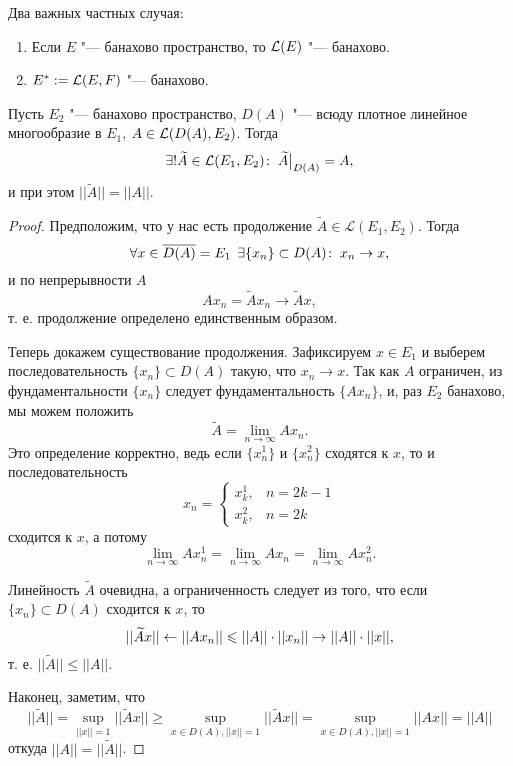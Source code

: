 \documentclass[main]{subfiles}
\begin{document}
\begin{corollary}
  Два важных частных случая:
  \begin{enumerate}
    \item Если \( E \) "--- банахово пространство, то \( \Linears{E} \) "---
      банахово.
    \item  \( E^* := \Linears{E}[F] \) "--- банахово.
  \end{enumerate}
\end{corollary}

\begin{theorem}
  Пусть \( E_2 \) "--- банахово пространство,
  \( D(A) \) "--- всюду плотное линейное многообразие
  в \( E_1 \), \( A \in \Linears{D(A)}[E_2] \).
  Тогда 
  \[
    \ExistsOne{\widetilde{A} \in \Linears{E_1}[E_2]}
    {\widetilde{A} \bigr|}_{D(A)} = A,
  \]
  и при этом \( ||\widetilde{A}|| = ||A|| \).
\end{theorem}
\begin{proof}
  Предположим, что у нас есть продолжение
  \( \widetilde{A} \in \mathcal{L}(E_1, E_2) \).
  Тогда
  \[
    \forall {x \in \overline{D(A)} = E_1} \; \,
    \exists  \{ x_n \} \subset D(A)  \colon \:
    x_n \to x,
  \]
  и по непрерывности \( A \)
  \[
    A x_n = \widetilde{A} x_n \to \widetilde{A} x,
  \]
  т. е. продолжение определено единственным образом.

  Теперь докажем существование продолжения.
  Зафиксируем \( x \in E_1 \) и выберем
  последовательность \( \{ x_n \} \subset D(A) \)
  такую, что \( x_n \to x \).
  Так как \( A \) ограничен, из фундаментальности
  \( \{ x_n \} \) следует фундаментальность
  \( \{ A x_n \} \), и, раз \( E_2 \) банахово,
  мы можем положить
  \[
    \widetilde{A} = \lim_{n \to \infty} A x_n.
  \]
  Это определение корректно, ведь если
  \( \{ x^1_n \} \) и \( \{ x^2_n \} \)
  сходятся к \( x \), то
  и последовательность
  \[
    x_n = \begin{cases}
      x^1_k, & n = 2k - 1 \\
      x^2_k, & n = 2k
    \end{cases}
  \]
  сходится к \( x \), а потому
  \[
    \lim_{n \to \infty} A x^1_n =
    \lim_{n \to \infty} A x_n = 
    \lim_{n \to \infty} A x^2_n.
  \]

  Линейность \( \widetilde{A} \) очевидна,
  а ограниченность следует из того,
  что если \( \{ x_n \} \subset D(A) \)
  сходится к \( x \),
  то
  \[
    ||\widetilde{A} x|| \leftarrow
    ||A x_n|| \leqslant
    ||A|| \cdot ||x_n|| \to
    ||A|| \cdot ||x||,
  \]
  т. е. \( ||\widetilde{A}|| \le ||A|| \).

  Наконец, заметим, что
  \[
    ||\widetilde{A}|| =
    \sup_{||x|| = 1} ||\widetilde{A} x|| \ge
    \sup_{x \in D(A), ||x|| = 1} ||\widetilde{A} x|| =
    \sup_{x \in D(A), ||x|| = 1} ||A x|| =
    ||A||
  \]
  откуда \( ||A|| = ||\widetilde{A}|| \).
\end{proof}
\end{document}
